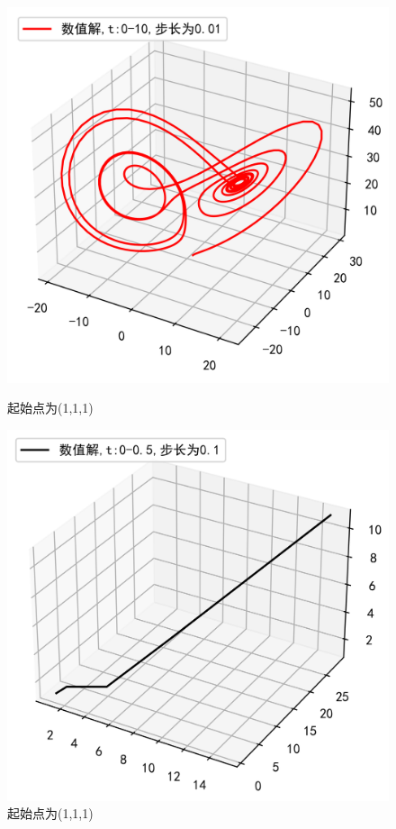 \documentclass[a4paper]{article}%
\begin{document}
\begin{figure}[h]
    \begin{minipage}[h]{0.48\linewidth}
    \centering
    \includegraphics[scale=0.65]{13}
    \caption{起始点为(1,1,1)}
    \end{minipage}
    \begin{minipage}[h]{0.48\linewidth}
    \centering
    \includegraphics[scale=0.65]{14}
    \caption{起始点为(1,1,1)}
    \end{minipage}
\end{figure}
\end{document}
